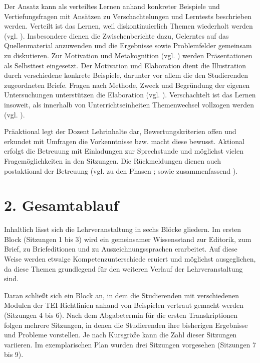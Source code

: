 \documentclass[
          a4paper,
        ]{article}
\begin{document}
Der Ansatz kann als verteiltes Lernen anhand konkreter Beispiele und
Vertiefungsfragen mit Ansätzen zu Verschachtelungen und Lerntests
beschrieben werden. Verteilt ist das Lernen, weil diskontinuierlich
Themen wiederholt werden (vgl. ). Insbesondere dienen die Zwischenberichte
dazu, Gelerntes auf das Quellenmaterial anzuwenden und die Ergebnisse
sowie Problemfelder gemeinsam zu diskutieren. Zur Motivation und
Metakognition (vgl. )
werden Präsentationen als Selbsttest eingesetzt. Der Motivation und
Elaboration dient die Illustration durch verschiedene konkrete
Beispiele, darunter vor allem die den Studierenden zugeordneten Briefe.
Fragen nach Methode, Zweck und Begründung der eigenen Untersuchungen
unterstützen die Elaboration (vgl. ). Verschachtelt ist das Lernen
insoweit, als innerhalb von Unterrichtseinheiten Themenwechsel vollzogen
werden (vgl. ).

Präaktional legt der Dozent Lehrinhalte dar, Bewertungskriterien offen
und erkundet mit Umfragen die Vorkenntnisse bzw. macht diese bewusst.
Aktional erfolgt die Betreuung mit Einladungen zur Sprechstunde und
möglichst vielen Fragemöglichkeiten in den Sitzungen. Die Rückmeldungen
dienen auch postaktional der Betreuung (vgl. zu den Phasen
; sowie
zusammenfassend ).

\section{2. Gesamtablauf}\label{gesamtablauf}

Inhaltlich lässt sich die Lehrveranstaltung in sechs Blöcke gliedern. Im
ersten Block (Sitzungen 1 bis 3) wird ein gemeinsamer Wissensstand zur
Editorik, zum Brief, zu Briefeditionen und zu Auszeichnungssprachen
erarbeitet. Auf diese Weise werden etwaige Kompetenzunterschiede eruiert
und möglichst ausgeglichen, da diese Themen grundlegend für den weiteren
Verlauf der Lehrveranstaltung sind.

Daran schließt sich ein Block an, in dem die Studierenden mit
verschiedenen Modulen der TEI-Richtlinien anhand von Beispielen vertraut
gemacht werden (Sitzungen 4 bis 6). Nach dem Abgabetermin für die ersten
Transkriptionen folgen mehrere Sitzungen, in denen die Studierenden ihre
bisherigen Ergebnisse und Probleme vorstellen. Je nach Kursgröße kann
die Zahl dieser Sitzungen variieren. Im exemplarischen Plan wurden drei
Sitzungen vorgesehen (Sitzungen 7 bis 9).
\end{document}
